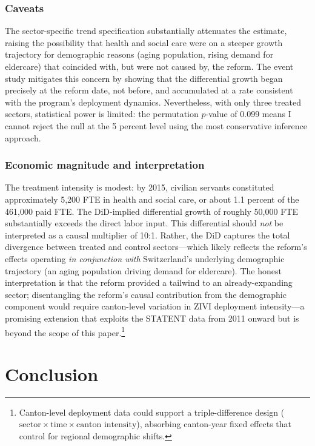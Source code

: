 \documentclass[12pt]{article}
\begin{document}
\subsubsection*{Caveats} The sector-specific trend specification substantially attenuates the estimate, raising the possibility that health and social care were on a steeper growth trajectory for demographic reasons (aging population, rising demand for eldercare) that coincided with, but were not caused by, the reform. The event study mitigates this concern by showing that the differential growth began precisely at the reform date, not before, and accumulated at a rate consistent with the program's deployment dynamics. Nevertheless, with only three treated sectors, statistical power is limited: the permutation $p$-value of 0.099 means I cannot reject the null at the 5 percent level using the most conservative inference approach.

\subsubsection*{Economic magnitude and interpretation} The treatment intensity is modest: by 2015, civilian servants constituted approximately 5,200 FTE in health and social care, or about 1.1 percent of the 461,000 paid FTE. The DiD-implied differential growth of roughly 50,000 FTE substantially exceeds the direct labor input. This differential should \textit{not} be interpreted as a causal multiplier of 10:1. Rather, the DiD captures the total divergence between treated and control sectors---which likely reflects the reform's effects operating \textit{in conjunction with} Switzerland's underlying demographic trajectory (an aging population driving demand for eldercare). The honest interpretation is that the reform provided a tailwind to an already-expanding sector; disentangling the reform's causal contribution from the demographic component would require canton-level variation in ZIVI deployment intensity---a promising extension that exploits the STATENT data from 2011 onward but is beyond the scope of this paper.\footnote{Canton-level deployment data could support a triple-difference design ($\text{sector} \times \text{time} \times \text{canton intensity}$), absorbing canton-year fixed effects that control for regional demographic shifts.}

\section{Conclusion}
\end{document}
